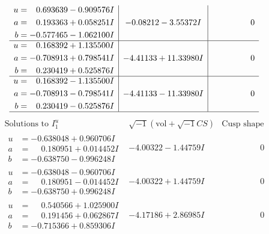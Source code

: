 \documentclass[1p]{elsarticle_modified}
\theoremstyle{definition}
\newcommand{\I}{\sqrt{-1}}
\begin{document}
$$\begin{array}{c|c|c}
\begin{aligned}
u &= \phantom{-}0.693639 - 0.909576 I \\
a &= \phantom{-}0.193363 + 0.058251 I \\
b &= -0.577465 - 1.062100 I\end{aligned}
 & -0.08212 - 3.55372 I & \phantom{-0.000000 } 0 \\ \hline\begin{aligned}
u &= \phantom{-}0.168392 + 1.135500 I \\
a &= -0.708913 + 0.798541 I \\
b &= \phantom{-}0.230419 + 0.525876 I\end{aligned}
 & -4.41133 + 11.33980 I & \phantom{-0.000000 } 0 \\ \hline\begin{aligned}
u &= \phantom{-}0.168392 - 1.135500 I \\
a &= -0.708913 - 0.798541 I \\
b &= \phantom{-}0.230419 - 0.525876 I\end{aligned}
 & -4.41133 - 11.33980 I & \phantom{-0.000000 } 0\\
 \hline 
 \end{array}$$\newpage$$\begin{array}{c|c|c}  
\text{Solutions to }I^u_{1}& \I (\text{vol} + \sqrt{-1}CS) & \text{Cusp shape}\\
 \hline 
\begin{aligned}
u &= -0.638048 + 0.960706 I \\
a &= \phantom{-}0.180951 + 0.014452 I \\
b &= -0.638750 - 0.996248 I\end{aligned}
 & -4.00322 - 1.44759 I & \phantom{-0.000000 } 0 \\ \hline\begin{aligned}
u &= -0.638048 - 0.960706 I \\
a &= \phantom{-}0.180951 - 0.014452 I \\
b &= -0.638750 + 0.996248 I\end{aligned}
 & -4.00322 + 1.44759 I & \phantom{-0.000000 } 0 \\ \hline\begin{aligned}
u &= \phantom{-}0.540566 + 1.025900 I \\
a &= \phantom{-}0.191456 + 0.062867 I \\
b &= -0.715366 + 0.859306 I\end{aligned}
 & -4.17186 + 2.86985 I & \phantom{-0.000000 } 0 \\ \hline\begin{aligned}

\end{aligned}
\end{array}$$
\end{document}
